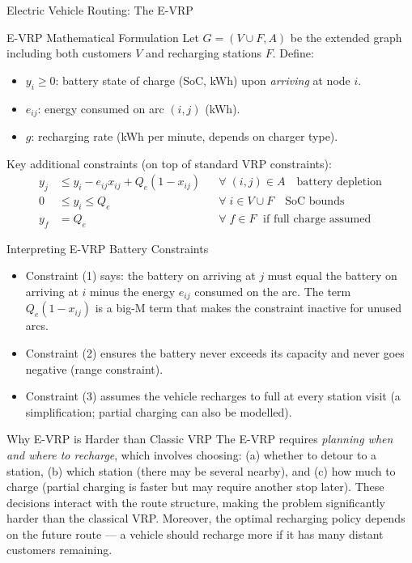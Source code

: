 \documentclass[aspectratio=169,10pt]{beamer}
\begin{document}
\begin{frame}[allowframebreaks]{Electric Vehicle Routing: The E-VRP}
  \framebreak

  \begin{block}{E-VRP Mathematical Formulation}
    Let $G = (V \cup F, A)$ be the extended graph including both customers
    $V$ and recharging stations $F$.  Define:
    \begin{itemize}
      \item $y_i \geq 0$: battery state of charge (SoC, kWh) upon \emph{arriving}
      at node $i$.
      \item $e_{ij}$: energy consumed on arc $(i,j)$ (kWh).
      \item $g$: recharging rate (kWh per minute, depends on charger type).
    \end{itemize}

    Key additional constraints (on top of standard VRP constraints):
    \begin{align}
      y_j &\leq y_i - e_{ij} x_{ij} + Q_e(1-x_{ij})
          && \forall\;(i,j)\in A \quad \text{battery depletion} \\[4pt]
      0   &\leq y_i \leq Q_e
          && \forall\; i \in V\cup F \quad \text{SoC bounds} \\[4pt]
      y_f &= Q_e
          && \forall\; f\in F \;\text{ if full charge assumed}
    \end{align}
  \end{block}

  \framebreak

  \begin{block}{Interpreting E-VRP Battery Constraints}
    \begin{itemize}
      \item Constraint (1) says: the battery on arriving at $j$ must equal
      the battery on arriving at $i$ minus the energy $e_{ij}$ consumed
      on the arc.  The term $Q_e(1-x_{ij})$ is a big-M term that makes
      the constraint inactive for unused arcs.
      \item Constraint (2) ensures the battery never exceeds its capacity
      and never goes negative (range constraint).
      \item Constraint (3) assumes the vehicle recharges to full at every
      station visit (a simplification; partial charging can also be modelled).
    \end{itemize}
  \end{block}

  \begin{alertblock}{Why E-VRP is Harder than Classic VRP}
    The E-VRP requires \emph{planning when and where to recharge}, which
    involves choosing: (a) whether to detour to a station, (b) which station
    (there may be several nearby), and (c) how much to charge
    (partial charging is faster but may require another stop later).
    These decisions interact with the route structure, making the problem
    significantly harder than the classical VRP.  Moreover, the optimal
    recharging policy depends on the future route --- a vehicle should recharge
    more if it has many distant customers remaining.
  \end{alertblock}


\end{frame}
\end{document}
